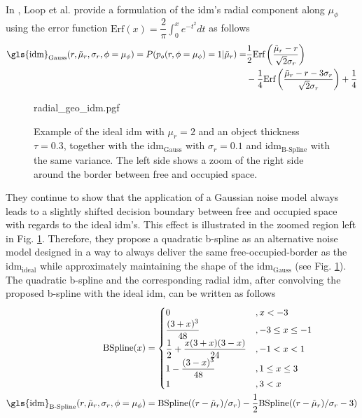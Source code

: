 \\
In \cite{loop2016closed}, Loop et al. provide a formulation of the \gls{idm}'s radial component along $\mu_\phi$ using the error function $\text{Erf}(x) = \dfrac{2}{\pi} \int_{0}^{x}e^{-t^2}dt$ as follows 
\begin{align}
	\label{eq:gauss_idm}
	\text{\gls{idm}}_{\text{Gauss}}(r,\tilde{\mu}_r, \sigma_r, \phi = \mu_\phi) = P(p_o(r, \phi = \mu_\phi) = 1 |\tilde{\mu}_r)  =& \dfrac{1}{2}\text{Erf}\left(\dfrac{\tilde{\mu}_r-r}{\sqrt{2}\sigma_r}\right)\\
	&- \dfrac{1}{4}\text{Erf}\left(\dfrac{\tilde{\mu}_r - r - 3\sigma_r}{\sqrt{2}\sigma_r}\right) + \dfrac{1}{4} \notag
\end{align}
\begin{figure}
	\begin{center}
		{radial_geo_idm.pgf}
		\caption{\label{fig:radial_geo_idm}Example of the ideal \gls{idm} with $\mu_r = 2$ and an object thickness $\tau = 0.3$, together with the \gls{idm}$_{\text{Gauss}}$ with $\sigma_r = 0.1$ and \gls{idm}$_{\text{B-Spline}}$ with the same variance. The left side shows a zoom of the right side around the border between free and occupied space.}
	\end{center}
\end{figure} 
They continue to show that the application of a Gaussian noise model always leads to a slightly shifted decision boundary between free and occupied space with regards to the ideal \gls{idm}'s. This effect is illustrated in the zoomed region left in Fig. \ref{fig:radial_geo_idm}. Therefore, they propose a quadratic b-spline as an alternative noise model designed in a way to always deliver the same free-occupied-border as the \gls{idm}$_{\text{ideal}}$ while approximately maintaining the shape of the \gls{idm}$_{\text{Gauss}}$ (see Fig. \ref{fig:radial_geo_idm}). The quadratic b-spline and the corresponding radial \gls{idm}, after convolving the proposed b-spline with the ideal \gls{idm}, can be written as follows
\begin{align}
	\label{eq:bspline}
	\text{BSpline}(x) &= 
	\begin{cases}
		0 &, x < -3\\
		\dfrac{(3+x)^3}{48} &, -3 \leq x \leq -1\\
		\dfrac{1}{2}+\dfrac{x(3+x)(3-x)}{24} &, -1 < x < 1\\
		1-\dfrac{(3-x)^3}{48} &, 1 \leq x \leq 3\\
		1 &, 3 < x\\
	\end{cases}\\
%
	\label{eq:bspline_idm}
	\text{\gls{idm}}_{\text{B-Spline}}(r,\tilde{\mu}_r, \sigma_r, \phi = \mu_\phi) &= \text{BSpline}((r - \tilde{\mu}_r)/\sigma_r) - \dfrac{1}{2}\text{BSpline}((r - \tilde{\mu}_r)/\sigma_r - 3)
\end{align}

